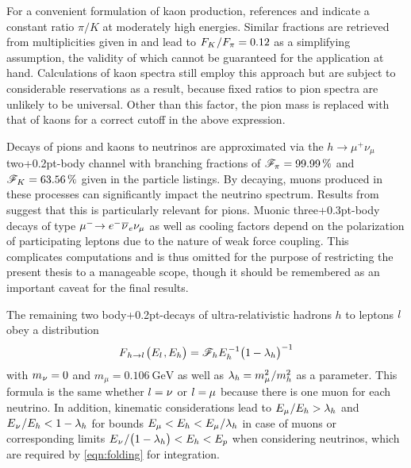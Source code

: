 \begin{spacing}{0.980}
	For a convenient formulation of kaon production, references \cite{Lykasov_2021} and \cite{Lykasov_2022} indicate a constant ratio
	$\pi / K$ at moderately high energies. Similar fractions are retrieved from multiplicities given in \cite{Koers_2006} and lead to
	$F_K \kern+0.5pt / F_\pi = \num{0.12}$ as a simplifying assumption, the validity of which cannot be guaranteed for the application
	at hand. Calculations of kaon spectra still employ this approach but are subject to considerable reservations as a result, because
	fixed ratios to pion spectra are unlikely to be universal. Other than this factor, the pion mass is replaced with that of kaons for
	a correct cutoff in the above expression.
	
	Decays of pions and kaons to neutrinos are approximated via the $h \rightarrow \mu^+ \nu_\mu$ two{\kern+0.2pt}-body channel
	with branching fractions of $\mathscr{F}_{\kern-0.2pt \pi \kern+0.2pt} = \qty{99.99}{\percent}$ and
	$\mathscr{F}_{\kern+0.3pt K \kern+0.2pt} = \qty{63.56}{\percent}$ given in the \cite{pdg}
	particle listings. By decaying, muons produced in these processes can significantly impact the neutrino spectrum. Results from
	\cite{Carpio_2020} suggest that this is particularly relevant for pions. Muonic three{\kern+0.3pt}-body decays of type
	$\mu^- \kern-2.5pt \kern+0.5pt \rightarrow e^- \kern+0.5pt \overline{\kern-0.2pt \nu \kern+0.8pt}_e \nu_\mu$ as well as
	cooling factors depend on the polarization of participating leptons due to the nature of weak force coupling. This complicates
	computations and is thus omitted for the purpose of restricting the present thesis to a manageable scope, though it should be
	remembered as an important caveat for the final results.
	
	The remaining two body{\kern+0.2pt}-decays of ultra-relativistic hadrons $h$ to leptons $l \kern+1.0pt$ obey a distribution
	\begin{equation*}
		F_{\kern+1.0pt h \kern+0.2pt \rightarrow l \kern+1.0pt} \bigl( E_l \kern+0.8pt, \kern-0.2pt E_h \bigr) =
		\mathscr{F}_{\kern+0.2pt h \kern+0.2pt} E_h^{\kern+1.0pt -1} \bigl( 1 \kern-0.3pt - \lambda_h \bigr)^{-1}
	\end{equation*}
	with $m_{\kern+0.5pt \nu} = 0$ and $m_\mu = \qty{0.106}{\giga\electronvolt}$ \cite{pdg} as well as
	$\lambda_h \kern-0.3pt = m_\mu^2 \kern+0.5pt / m_h^2$ as a parameter. This formula is the same whether
	$l = \nu \kern+0.2pt$ or $l = \kern-0.3pt \mu$ because there is one muon for each neutrino. In addition,
	kinematic considerations lead to $E_\mu \kern+0.5pt / E_h > \lambda_h$ and
	$E_{\kern+0.5pt \nu} \kern+0.5pt / E_h < 1 - \lambda_h$ for bounds
	$E_\mu < E_h < E_\mu \kern+0.5pt / \lambda_h$ in case of muons or corresponding limits
	$E_{\kern+0.5pt \nu} \kern+0.5pt / \smash{\bigl( 1 - \lambda_h \bigr)} < E_h < E_p$ when considering neutrinos, which are
	required by \eqref{eqn:folding} for integration.
	

\end{spacing}
